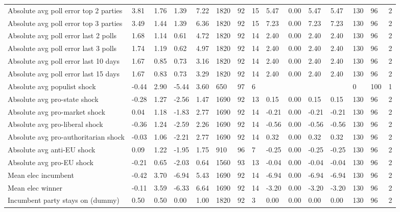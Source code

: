 \begin{longtable}{lllllllllllllll}
Absolute avg poll error top 2 parties & 3.81 & 1.76 & 1.39 & 7.22 & 1820 & 92 & 15 & 5.47 & 0.00 & 5.47 & 5.47 & 130 & 96 & 2\\
Absolute avg poll error top 3 parties & 3.49 & 1.44 & 1.39 & 6.36 & 1820 & 92 & 15 & 7.23 & 0.00 & 7.23 & 7.23 & 130 & 96 & 2\\
Absolute avg poll error last 2 polls & 1.68 & 1.14 & 0.61 & 4.72 & 1820 & 92 & 14 & 2.40 & 0.00 & 2.40 & 2.40 & 130 & 96 & 2\\
\addlinespace
Absolute avg poll error last 3 polls & 1.74 & 1.19 & 0.62 & 4.97 & 1820 & 92 & 14 & 2.40 & 0.00 & 2.40 & 2.40 & 130 & 96 & 2\\
Absolute avg poll error last 10 days & 1.67 & 0.85 & 0.73 & 3.16 & 1820 & 92 & 14 & 2.40 & 0.00 & 2.40 & 2.40 & 130 & 96 & 2\\
Absolute avg poll error last 15 days & 1.67 & 0.83 & 0.73 & 3.29 & 1820 & 92 & 14 & 2.40 & 0.00 & 2.40 & 2.40 & 130 & 96 & 2\\
Absolute avg populist shock & -0.44 & 2.90 & -5.44 & 3.60 & 650 & 97 & 6 &  &  &  &  & 0 & 100 & 1\\
Absolute avg pro-state shock & -0.28 & 1.27 & -2.56 & 1.47 & 1690 & 92 & 13 & 0.15 & 0.00 & 0.15 & 0.15 & 130 & 96 & 2\\
\addlinespace
Absolute avg pro-market shock & 0.04 & 1.18 & -1.83 & 2.77 & 1690 & 92 & 14 & -0.21 & 0.00 & -0.21 & -0.21 & 130 & 96 & 2\\
Absolute avg pro-liberal shock & -0.36 & 1.24 & -2.59 & 2.26 & 1690 & 92 & 14 & -0.56 & 0.00 & -0.56 & -0.56 & 130 & 96 & 2\\
Absolute avg pro-authoritarian shock & -0.03 & 1.06 & -2.21 & 2.77 & 1690 & 92 & 14 & 0.32 & 0.00 & 0.32 & 0.32 & 130 & 96 & 2\\
Absolute avg anti-EU shock & 0.09 & 1.22 & -1.95 & 1.75 & 910 & 96 & 7 & -0.25 & 0.00 & -0.25 & -0.25 & 130 & 96 & 2\\
Absolute avg pro-EU shock & -0.21 & 0.65 & -2.03 & 0.64 & 1560 & 93 & 13 & -0.04 & 0.00 & -0.04 & -0.04 & 130 & 96 & 2\\
\addlinespace
Mean elec incumbent & -0.42 & 3.70 & -6.94 & 5.43 & 1690 & 92 & 14 & -6.94 & 0.00 & -6.94 & -6.94 & 130 & 96 & 2\\
Mean elec winner & -0.11 & 3.59 & -6.33 & 6.64 & 1690 & 92 & 14 & -3.20 & 0.00 & -3.20 & -3.20 & 130 & 96 & 2\\
Incumbent party stays on (dummy) & 0.50 & 0.50 & 0.00 & 1.00 & 1820 & 92 & 3 & 0.00 & 0.00 & 0.00 & 0.00 & 130 & 96 & 2\\

\end{longtable}
